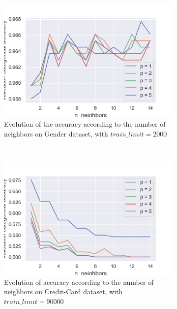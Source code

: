 \documentclass[10pt]{article}
\begin{document}
		\begin{figure}
			\centering
			\begin{subfigure}[]{0.45\columnwidth}
				\centering
				\includegraphics[width=\linewidth]{../graphics/knn_gender_neighbors.png}
				\caption{Evolution of the accuracy according to the number of neighbors on Gender dataset, with $train\_limit = 2000$}
				\label{knn:g_neighbors}
			\end{subfigure}
			~
			\begin{subfigure}[]{0.45\columnwidth}
				\centering
				\includegraphics[width=\linewidth]{../graphics/knn_creditcard_neighbors.png}
				\caption{Evolution of accuracy according to the number of neighbors on Credit-Card dataset, with $train\_limit = 90000$}
				\label{knn:cc_neighbors}
			\end{subfigure}
			\begin{subfigure}[]{0.45\columnwidth}

\end{subfigure}
\end{figure}
\end{document}
